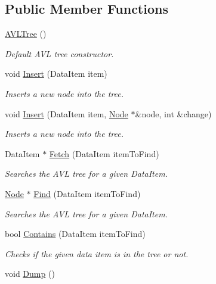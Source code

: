 \subsection*{Public Member Functions}
\begin{DoxyCompactItemize}
\item 
\hyperlink{classAVLTree_a685459c83f9879c6c99687cd620033cc}{A\-V\-L\-Tree} ()
\begin{DoxyCompactList}\small\item\em Default A\-V\-L tree constructor. \end{DoxyCompactList}\item 
void \hyperlink{classAVLTree_a19150bcba8501c6ae6fb2b519ad64b05}{Insert} (Data\-Item item)
\begin{DoxyCompactList}\small\item\em Inserts a new node into the tree. \end{DoxyCompactList}\item 
void \hyperlink{classAVLTree_a7d45f6097e6f9f696ed80b80c8a88722}{Insert} (Data\-Item item, \hyperlink{structAVLTree_1_1Node}{Node} $\ast$\&node, int \&change)
\begin{DoxyCompactList}\small\item\em Inserts a new node into the tree. \end{DoxyCompactList}\item 
Data\-Item $\ast$ \hyperlink{classAVLTree_a8c1cdcd4e4be5f0feb9b2bad5ef08b08}{Fetch} (Data\-Item item\-To\-Find)
\begin{DoxyCompactList}\small\item\em Searches the A\-V\-L tree for a given Data\-Item. \end{DoxyCompactList}\item 
\hyperlink{structAVLTree_1_1Node}{Node} $\ast$ \hyperlink{classAVLTree_a88e4e21a384e6dc4d9be64bfd26e642e}{Find} (Data\-Item item\-To\-Find)
\begin{DoxyCompactList}\small\item\em Searches the A\-V\-L tree for a given Data\-Item. \end{DoxyCompactList}\item 
bool \hyperlink{classAVLTree_af87b660c0c905507b3210abeecff8f8f}{Contains} (Data\-Item item\-To\-Find)
\begin{DoxyCompactList}\small\item\em Checks if the given data item is in the tree or not. \end{DoxyCompactList}\item 
\hypertarget{classAVLTree_a04db67e206a1d00093ae74a6506dcf59}{void \hyperlink{classAVLTree_a04db67e206a1d00093ae74a6506dcf59}{Dump} ()}\label{classAVLTree_a04db67e206a1d00093ae74a6506dcf59}


\end{DoxyCompactItemize}
